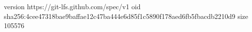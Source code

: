 version https://git-lfs.github.com/spec/v1
oid sha256:4cee47318bae9baffae12c47ba444e6d85f1c5890f178aed6fb5fbacdb2210d9
size 105576
